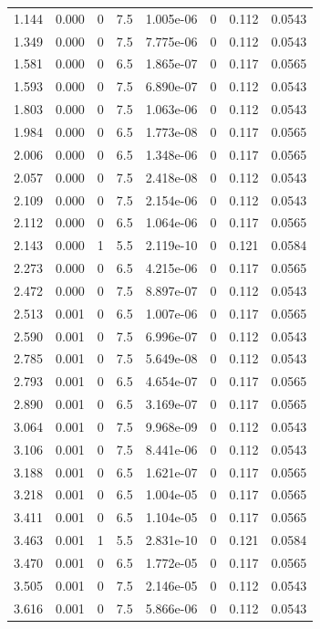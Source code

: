 \documentclass[preview]{standalone}
\begin{document}
{{\begin{tabular}{L{1.2cm}C{1.2cm} C{0.3cm}C{0.5cm} C{1.4cm}C{1.4cm} C{1.4cm}C{1.4cm}}
  1.144  &  0.000  & 0     & 7.5 &  1.005e-06  & 0  & 0.112 &  0.0543   \\ 
  1.349  &  0.000  & 0     & 7.5 &  7.775e-06  & 0  & 0.112 &  0.0543   \\ 
  1.581  &  0.000  & 0     & 6.5 &  1.865e-07  & 0  & 0.117 &  0.0565   \\ 
  1.593  &  0.000  & 0     & 7.5 &  6.890e-07  & 0  & 0.112 &  0.0543   \\ 
  1.803  &  0.000  & 0     & 7.5 &  1.063e-06  & 0  & 0.112 &  0.0543   \\ 
  1.984  &  0.000  & 0     & 6.5 &  1.773e-08  & 0  & 0.117 &  0.0565   \\ 
  2.006  &  0.000  & 0     & 6.5 &  1.348e-06  & 0  & 0.117 &  0.0565   \\ 
  2.057  &  0.000  & 0     & 7.5 &  2.418e-08  & 0  & 0.112 &  0.0543   \\ 
  2.109  &  0.000  & 0     & 7.5 &  2.154e-06  & 0  & 0.112 &  0.0543   \\ 
  2.112  &  0.000  & 0     & 6.5 &  1.064e-06  & 0  & 0.117 &  0.0565   \\ 
  2.143  &  0.000  & 1     & 5.5 &  2.119e-10  & 0  & 0.121 &  0.0584   \\ 
  2.273  &  0.000  & 0     & 6.5 &  4.215e-06  & 0  & 0.117 &  0.0565   \\ 
  2.472  &  0.000  & 0     & 7.5 &  8.897e-07  & 0  & 0.112 &  0.0543   \\ 
  2.513  &  0.001  & 0     & 6.5 &  1.007e-06  & 0  & 0.117 &  0.0565   \\ 
  2.590  &  0.001  & 0     & 7.5 &  6.996e-07  & 0  & 0.112 &  0.0543   \\ 
  2.785  &  0.001  & 0     & 7.5 &  5.649e-08  & 0  & 0.112 &  0.0543   \\ 
  2.793  &  0.001  & 0     & 6.5 &  4.654e-07  & 0  & 0.117 &  0.0565   \\ 
  2.890  &  0.001  & 0     & 6.5 &  3.169e-07  & 0  & 0.117 &  0.0565   \\ 
  3.064  &  0.001  & 0     & 7.5 &  9.968e-09  & 0  & 0.112 &  0.0543   \\ 
  3.106  &  0.001  & 0     & 7.5 &  8.441e-06  & 0  & 0.112 &  0.0543   \\ 
  3.188  &  0.001  & 0     & 6.5 &  1.621e-07  & 0  & 0.117 &  0.0565   \\ 
  3.218  &  0.001  & 0     & 6.5 &  1.004e-05  & 0  & 0.117 &  0.0565   \\ 
  3.411  &  0.001  & 0     & 6.5 &  1.104e-05  & 0  & 0.117 &  0.0565   \\ 
  3.463  &  0.001  & 1     & 5.5 &  2.831e-10  & 0  & 0.121 &  0.0584   \\ 
  3.470  &  0.001  & 0     & 6.5 &  1.772e-05  & 0  & 0.117 &  0.0565   \\ 
  3.505  &  0.001  & 0     & 7.5 &  2.146e-05  & 0  & 0.112 &  0.0543   \\ 
  3.616  &  0.001  & 0     & 7.5 &  5.866e-06  & 0  & 0.112 &  0.0543   \\ 
\hline 
\end{tabular} 

}}
\end{document}
